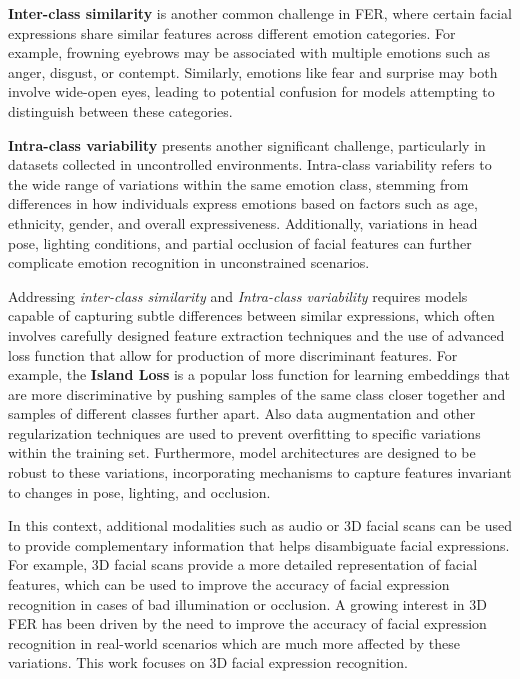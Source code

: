 \textbf{Inter-class similarity} is another common challenge in FER, where certain facial expressions share similar features across different emotion categories. For example, frowning eyebrows may be associated with multiple emotions such as anger, disgust, or contempt. Similarly, emotions like fear and surprise may both involve wide-open eyes, leading to potential confusion for models attempting to distinguish between these categories. 

\textbf{Intra-class variability} presents another significant challenge, particularly in datasets collected in uncontrolled environments. Intra-class variability refers to the wide range of variations within the same emotion class, stemming from differences in how individuals express emotions based on factors such as age, ethnicity, gender, and overall expressiveness. Additionally, variations in head pose, lighting conditions, and partial occlusion of facial features can further complicate emotion recognition in unconstrained scenarios. 

Addressing \textit{inter-class similarity} and \textit{Intra-class variability} requires models capable of capturing subtle differences between similar expressions, which often involves carefully designed feature extraction techniques and the use of advanced loss function that allow for production of more discriminant features. For example, the \textbf{Island Loss} \cite{island_loss} is a popular loss function for learning embeddings that are more discriminative by pushing samples of the same class closer together and samples of different classes further apart.
Also data augmentation and other regularization techniques are used to prevent overfitting to specific variations within the training set. Furthermore, model architectures are designed to be robust to these variations, incorporating mechanisms to capture features invariant to changes in pose, lighting, and occlusion. 

In this context, additional modalities such as audio or 3D facial scans can be used to provide complementary information that helps disambiguate facial expressions. For example,  3D facial scans provide a more detailed representation of facial features, which can be used to improve the accuracy of facial expression recognition in cases of bad illumination or occlusion. A growing interest in 3D FER has been driven by the need to improve the accuracy of facial expression recognition in real-world scenarios which are much more affected by these variations. This work focuses on 3D facial expression recognition.\\

